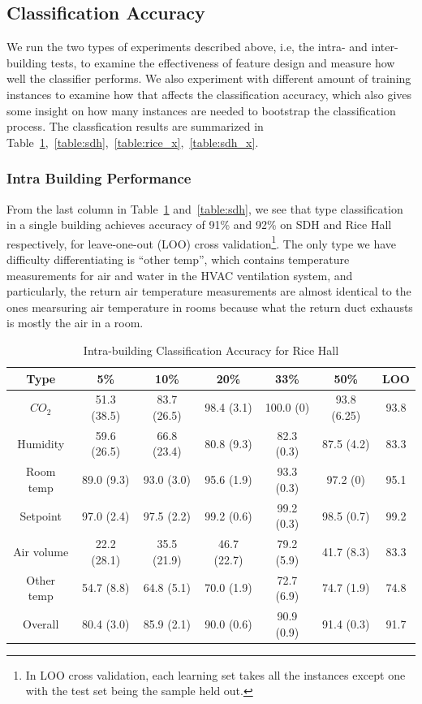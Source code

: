 \subsection{Classification Accuracy}
We run the two types of experiments described above, i.e, the intra- and inter- building tests, to examine the effectiveness of feature design and measure how well 
the classifier performs. We also experiment with different amount of training instances to examine how that affects the classification accuracy, which also gives 
some insight on how many instances are needed to bootstrap the classification process. The classfication results are summarized in Table~\ref{table:rice},~\ref{table:sdh},~\ref{table:rice_x},~\ref{table:sdh_x}.

\subsubsection{Intra Building Performance}
From the last column in Table~\ref{table:rice} and~\ref{table:sdh}, we see that type classification in a single building achieves accuracy of 91\% and 92\% on SDH and Rice Hall respectively, for leave-one-out (LOO) cross validation\footnote{In LOO cross validation, each learning set takes all the instances except one with the test set being the sample held out.}. The only type we have difficulty differentiating is ``other temp'', which contains temperature measurements for air and water in the HVAC ventilation system, and particularly, the return air temperature measurements are almost identical to the ones mearsuring air temperature in rooms because what the return duct exhausts is mostly the air in a room.

\begin{table}[ht!]
\centering %
\begin{tabular}{c | c | c | c | c | c | c}%
\hline %
Type & 5\% & 10\% & 20\% & 33\% & 50\% & LOO\\ %
\hline\hline %
$CO_{2}$ & 51.3 (38.5) & 83.7 (26.5) & 98.4 (3.1) & 100.0 (0) & 93.8 (6.25) & 93.8\\ \hline
Humidity & 59.6 (26.5) & 66.8 (23.4) & 80.8 (9.3) & 82.3 (0.3) & 87.5 (4.2) & 83.3\\ \hline
Room temp & 89.0 (9.3) & 93.0 (3.0) & 95.6 (1.9) & 93.3 (0.3) & 97.2 (0) & 95.1\\ \hline
Setpoint & 97.0 (2.4) & 97.5 (2.2) & 99.2 (0.6) & 99.2 (0.3) & 98.5 (0.7) & 99.2\\ \hline
Air volume & 22.2 (28.1) & 35.5 (21.9) & 46.7 (22.7) & 79.2 (5.9) & 41.7 (8.3) & 83.3\\ \hline
Other temp & 54.7 (8.8) & 64.8 (5.1) & 70.0 (1.9) & 72.7 (6.9) & 74.7 (1.9) & 74.8\\ \hline
Overall & 80.4 (3.0) & 85.9 (2.1) & 90.0 (0.6) & 90.9 (0.9) & 91.4 (0.3) & 91.7\\ \hline
\end{tabular}
\caption{Intra-building Classification Accuracy for Rice Hall}
\label{table:rice} %
\end{table}

